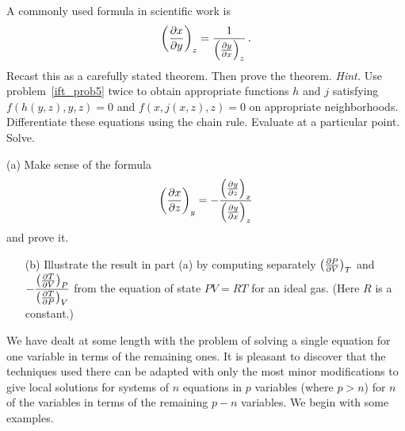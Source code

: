 %
%
%
%
%

\begin{prob} A commonly used formula in scientific work is
  \[ \left(\frac{\partial x}{\partial y}\right)_{z} = \frac 1{\left(\frac{\partial y}{\partial x}\right)_{z}}\,. \]
Recast this as a carefully stated theorem.  Then prove the theorem.  \emph{Hint.} Use
problem~\ref{ift_prob5} twice to obtain appropriate functions $h$ and $j$ satisfying
$f(h(y,z),y,z) = 0$ and $f(x,j(x,z),z) = 0$ on appropriate neighborhoods. Differentiate these
equations using the chain rule. Evaluate at a particular point. Solve.
\end{prob}


\begin{prob}(a) Make sense of the formula
  \[ \left(\frac{\partial x}{\partial z}\right)_{y} = -\frac{\left(\frac{\partial y}{\partial z}\right)_{x}}{\left(\frac{\partial y}{\partial x}\right)_{z}} \]
and prove it.
 \begin{enumerate}
   \item[(b)] Illustrate the result in part (a) by computing separately $\left(\frac{\partial P}{\partial V}\right)_{T}$ and
$-\dfrac{\left(\frac{\partial T}{\partial V}\right)_{P}}{\left(\frac{\partial T}{\partial P}\right)_{V}}$ from the equation of state $PV = RT$ for an ideal gas. (Here $R$
is a constant.)
 \end{enumerate}
\end{prob}

We have dealt at some length with the problem of solving a single equation for one variable in
terms of the remaining ones.  It is pleasant to discover that the techniques used there can be
adapted with only the most minor modifications to give local solutions for systems of $n$
equations in $p$ variables (where $p > n$) for $n$ of the variables in terms of the remaining
$p-n$ variables. We begin with some examples.

